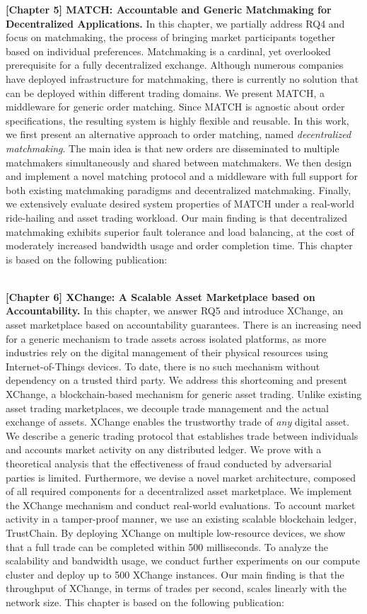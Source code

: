 \textbf{[Chapter 5] MATCH: Accountable and Generic Matchmaking for Decentralized Applications.}
In this chapter, we partially address RQ4 and focus on matchmaking, the process of bringing market participants together based on individual preferences.
Matchmaking is a cardinal, yet overlooked prerequisite for a fully decentralized exchange.
Although numerous companies have deployed infrastructure for matchmaking, there is currently no solution that can be deployed within different trading domains.
We present MATCH, a middleware for generic order matching.
Since MATCH is agnostic about order specifications, the resulting system is highly flexible and reusable.
In this work, we first present an alternative approach to order matching, named \emph{decentralized matchmaking}.
The main idea is that new orders are disseminated to multiple matchmakers simultaneously and shared between matchmakers.
We then design and implement a novel matching protocol and a middleware with full support for both existing matchmaking paradigms and decentralized matchmaking.
Finally, we extensively evaluate desired system properties of MATCH under a real-world ride-hailing and asset trading workload.
Our main finding is that decentralized matchmaking exhibits superior fault tolerance and load balancing, at the cost of moderately increased bandwidth usage and order completion time.
This chapter is based on the following publication:

\\

\textbf{[Chapter 6] XChange: A Scalable Asset Marketplace based on Accountability.}
In this chapter, we answer RQ5 and introduce XChange, an asset marketplace based on accountability guarantees.
There is an increasing need for a generic mechanism to trade assets across isolated platforms, as more industries rely on the digital management of their physical resources using Internet-of-Things devices.
To date, there is no such mechanism without dependency on a trusted third party.
We address this shortcoming and present XChange, a blockchain-based mechanism for generic asset trading.
Unlike existing asset trading marketplaces, we decouple trade management and the actual exchange of assets.
XChange enables the trustworthy trade of \emph{any} digital asset.
We describe a generic trading protocol that establishes trade between individuals and accounts market activity on any distributed ledger.
We prove with a theoretical analysis that the effectiveness of fraud conducted by adversarial parties is limited.
Furthermore, we devise a novel market architecture, composed of all required components for a decentralized asset marketplace.
We implement the XChange mechanism and conduct real-world evaluations.
To account market activity in a tamper-proof manner, we use an existing scalable blockchain ledger, TrustChain.
By deploying XChange on multiple low-resource devices, we show that a full trade can be completed within 500 milliseconds.
To analyze the scalability and bandwidth usage, we conduct further experiments on our compute cluster and deploy up to 500 XChange instances.
Our main finding is that the throughput of XChange, in terms of trades per second, scales linearly with the network size.
This chapter is based on the following publication:

